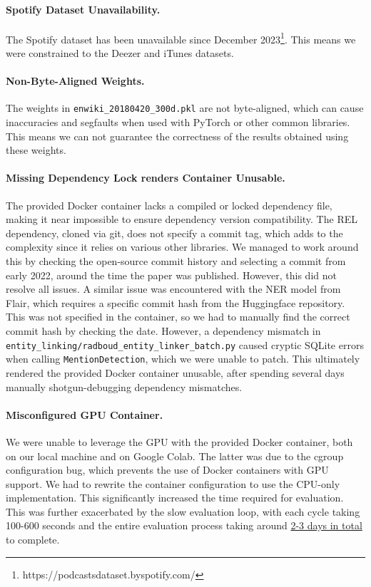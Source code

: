 \documentclass[manuscript]{acmart}
\begin{document}
\paragraph{Spotify Dataset Unavailability.} The Spotify dataset has been unavailable since December 2023\footnote{https://podcastsdataset.byspotify.com/}. This means we were constrained to the Deezer and iTunes datasets.

\paragraph{Non-Byte-Aligned Weights.} The weights in \texttt{enwiki\_20180420\_300d.pkl} are not byte-aligned, which can cause inaccuracies and segfaults when used with PyTorch or other common libraries. This means we can not guarantee the correctness of the results obtained using these weights.

\paragraph{Missing Dependency Lock renders Container Unusable.} The provided Docker container lacks a compiled or locked dependency file, making it near impossible to ensure dependency version compatibility. The REL dependency, cloned via git, does not specify a commit tag, which adds to the complexity since it relies on various other libraries. We managed to work around this by checking the open-source commit history and selecting a commit from early 2022, around the time the paper was published. However, this did not resolve all issues. A similar issue was encountered with the NER model from Flair, which requires a specific commit hash from the Huggingface repository. This was not specified in the container, so we had to manually find the correct commit hash by checking the date. However, a dependency mismatch in \texttt{entity\_linking/radboud\_entity\_linker\_batch.py} caused cryptic SQLite errors when calling \texttt{MentionDetection}, which we were unable to patch. This ultimately rendered the provided Docker container unusable, after spending several days manually shotgun-debugging dependency mismatches.

\paragraph{Misconfigured GPU Container.} We were unable to leverage the GPU with the provided Docker container, both on our local machine and on Google Colab. The latter was due to the cgroup configuration bug, which prevents the use of Docker containers with GPU support. We had to rewrite the container configuration to use the CPU-only implementation. This significantly increased the time required for evaluation. This was further exacerbated by the slow evaluation loop, with each cycle taking 100-600 seconds and the entire evaluation process taking around \underline{2-3 days in total} to complete.
\end{document}
